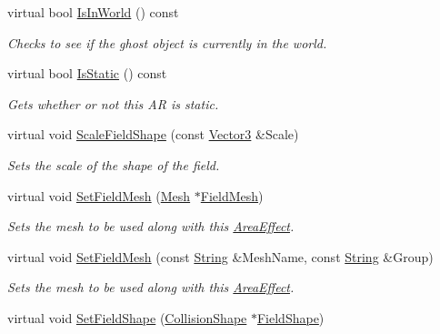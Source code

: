 \begin{DoxyCompactItemize}
virtual bool \hyperlink{classMezzanine_1_1AreaEffect_aee16d398d7788f6e0fd5e597bcdbd106}{IsInWorld} () const 
\begin{DoxyCompactList}\small\item\em Checks to see if the ghost object is currently in the world. \item\end{DoxyCompactList}\item 
virtual bool \hyperlink{classMezzanine_1_1AreaEffect_a9b2c07dd426285aff44d5faaca4b3356}{IsStatic} () const 
\begin{DoxyCompactList}\small\item\em Gets whether or not this AR is static. \item\end{DoxyCompactList}\item 
virtual void \hyperlink{classMezzanine_1_1AreaEffect_aac92fc4ba682d509f6385e999f68c75d}{ScaleFieldShape} (const \hyperlink{classMezzanine_1_1Vector3}{Vector3} \&Scale)
\begin{DoxyCompactList}\small\item\em Sets the scale of the shape of the field. \item\end{DoxyCompactList}\item 
virtual void \hyperlink{classMezzanine_1_1AreaEffect_aa9e8a5e1ffee5aa11ab4958373b06f09}{SetFieldMesh} (\hyperlink{classMezzanine_1_1Mesh}{Mesh} $\ast$\hyperlink{classMezzanine_1_1AreaEffect_a5ca3984a40d2678b786f518667fde27f}{FieldMesh})
\begin{DoxyCompactList}\small\item\em Sets the mesh to be used along with this \hyperlink{classMezzanine_1_1AreaEffect}{AreaEffect}. \item\end{DoxyCompactList}\item 
virtual void \hyperlink{classMezzanine_1_1AreaEffect_a5e2902749c630af5272d2dc89678392c}{SetFieldMesh} (const \hyperlink{namespaceMezzanine_acf9fcc130e6ebf08e3d8491aebcf1c86}{String} \&MeshName, const \hyperlink{namespaceMezzanine_acf9fcc130e6ebf08e3d8491aebcf1c86}{String} \&Group)
\begin{DoxyCompactList}\small\item\em Sets the mesh to be used along with this \hyperlink{classMezzanine_1_1AreaEffect}{AreaEffect}. \item\end{DoxyCompactList}\item 
virtual void \hyperlink{classMezzanine_1_1AreaEffect_a759a0a5f4becf94c87aff85b0681f663}{SetFieldShape} (\hyperlink{classMezzanine_1_1CollisionShape}{CollisionShape} $\ast$\hyperlink{classMezzanine_1_1AreaEffect_a54f08718bc742934f2ef6b4bd978c9d2}{FieldShape})

\end{DoxyCompactItemize}
